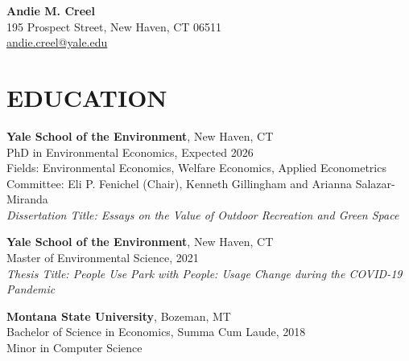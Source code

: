 \documentclass[11pt]{article}
\begin{document}
\begin{center}
    \textbf{\Huge Andie M. Creel} \\
    195 Prospect Street, New Haven, CT 06511 \\
    \href{mailto:andie.creel@yale.edu}{andie.creel@yale.edu}
\end{center}

\section*{EDUCATION}
\textbf{Yale School of the Environment}, New Haven, CT \\
PhD in Environmental Economics, Expected 2026 \\
Fields: Environmental Economics, Welfare Economics, Applied Econometrics\\
Committee: Eli P. Fenichel (Chair), Kenneth Gillingham and Arianna Salazar-Miranda \\
\textit{Dissertation Title: Essays on the Value of Outdoor Recreation and Green Space}

\textbf{Yale School of the Environment}, New Haven, CT \\
Master of Environmental Science, 2021 \\
\textit{Thesis Title: People Use Park with People: Usage Change during the COVID-19 Pandemic}

\textbf{Montana State University}, Bozeman, MT \\
Bachelor of Science in Economics, Summa Cum Laude, 2018 \\
Minor in Computer Science
\end{document}
